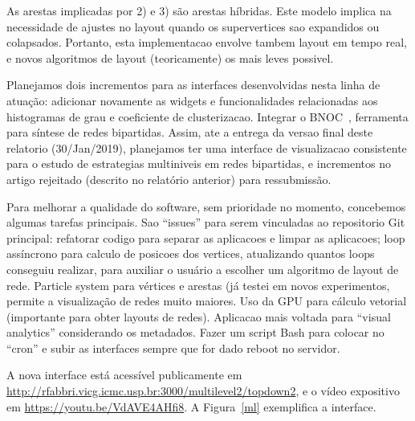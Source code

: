 \documentclass[a4paper, 11pt]{article}
\begin{document}
As arestas implicadas por 2) e 3) são arestas híbridas.
Este modelo implica na necessidade de ajustes no layout quando
os supervertices sao expandidos ou colapsados.
Portanto, esta implementacao envolve tambem layout em tempo real,
e novos algoritmos de layout (teoricamente) os mais leves possivel.

Planejamos 
dois incrementos para as interfaces desenvolvidas nesta linha de atuação:
adicionar novamente as widgets e funcionalidades relacionadas aos histogramas
de grau e coeficiente de clusterizacao.
Integrar o BNOC~\cite{bnoc}, ferramenta para síntese de redes bipartidas.
Assim, ate a entrega da versao final deste relatorio (30/Jan/2019),
planejamos ter uma interface de visualizacao consistente para o estudo de estrategias
multiniveis em redes bipartidas, e incrementos no artigo rejeitado (descrito no relatório anterior)
para ressubmissão.

Para melhorar a qualidade do software, sem prioridade no momento,
concebemos algumas tarefas principais.
Sao ``issues'' para serem vinculadas ao repositorio Git principal:
refatorar codigo para separar as aplicacoes e limpar as aplicacoes;
loop assíncrono para calculo de posicoes dos vertices,
atualizando quantos loops conseguiu realizar, para auxiliar o usuário a escolher um algoritmo de layout de rede.
Particle system para vértices e arestas (já testei em novos experimentos, permite a visualização de redes muito maiores. Uso da GPU para cálculo vetorial (importante para obter layouts de redes).  Aplicacao mais voltada para ``visual analytics'' considerando os metadados. Fazer um script Bash para colocar no ``cron'' e subir as interfaces sempre que for dado reboot no servidor.

    A nova interface está acessível  publicamente em \url{http://rfabbri.vicg.icmc.usp.br:3000/multilevel2/topdown2}, e o vídeo expositivo em \url{https://youtu.be/VdAVE4AHfi8}.
    A Figura~\ref{ml} exemplifica a interface.
\end{document}
